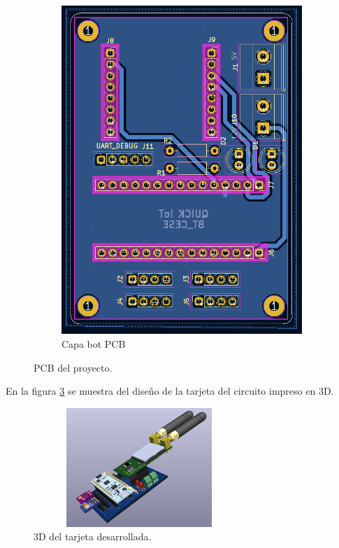 \begin{figure}[h!]
\begin{subfigure}[b]{0.27\linewidth}
  \includegraphics[width=\linewidth]{./Figures/pcb_bot.png}
  \caption{Capa bot PCB}
  \label{fig:Capa bot PCB}
  \end{subfigure}
  \caption{PCB del proyecto.}
  \label{fig:PCB del proyecto}
  \end{figure}

En la figura \ref{fig:3D del modulo} se muestra del diseño de la tarjeta del circuito impreso en 3D.
\begin{figure}[h!]
  \centering
	\includegraphics[width=8cm, height=4.5cm]{./Figures/tarjeta3d.png}
  \caption{3D del tarjeta desarrollada.}
	\label{fig:3D del modulo}
\end{figure}
